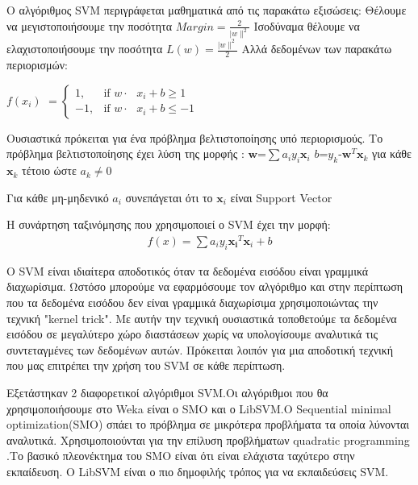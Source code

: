 Ο αλγόριθμος SVM περιγράφεται μαθηματικά από τις παρακάτω εξισώσεις:
\newline
Θέλουμε να μεγιστοποιήσουμε την ποσότητα   $ Margin=\frac{2}{|w\|^2} $
\newline
Ισοδύναμα θέλουμε να ελαχιστοποιήσουμε την ποσότητα  $ L(w)=\frac{|w\|^2}{2} $
\newline
	Αλλά δεδομένων των παρακάτω περιορισμών:


 $f(x_i)$ 
$ = \begin{cases} 1, & \mbox{if } w\cdot\mbox{ $x_i +b \geq 1 $} \\ -1, & \mbox{if } w\cdot\mbox{ $x_i +b \leq -1 $} \end{cases} $


 Ουσιαστικά πρόκειται για ένα πρόβλημα βελτιστοποίησης υπό περιορισμούς.
 Το πρόβλημα βελτιστοποίησης έχει λύση της μορφής :
\newline $\boldsymbol  w $=$\sum a_i y_i \boldsymbol x_i $ $b$=$y_k$-$\boldsymbol w^T \boldsymbol x_k$ για κάθε $\boldsymbol x_k$ τέτοιο ώστε $a_k\not= 0$
 
 Για κάθε μη-μηδενικό $a_i$ συνεπάγεται ότι το $\boldsymbol x_i$ είναι Support Vector
 
 Η συνάρτηση ταξινόμησης που χρησιμοποιεί ο SVM έχει την μορφή:
\begin{align*} 
f(x)=\sum a_i y_i \boldsymbol {x_i}^T \boldsymbol x_i +b
\end{align*}

Ο SVM είναι ιδιαίτερα αποδοτικός όταν τα δεδομένα εισόδου είναι γραμμικά διαχωρίσιμα. Ωστόσο μπορούμε να
 εφαρμόσουμε τον αλγόριθμο και στην περίπτωση που τα δεδομένα εισόδου δεν είναι γραμμικά διαχωρίσιμα
 χρησιμοποιώντας την τεχνική "kernel trick". Με αυτήν την τεχνική ουσιαστικά τοποθετούμε τα δεδομένα εισόδου σε μεγαλύτερο χώρο διαστάσεων χωρίς να υπολογίσουμε αναλυτικά τις συντεταγμένες των δεδομένων αυτών. Πρόκειται λοιπόν για μια αποδοτική τεχνική που μας επιτρέπει την χρήση του SVM σε κάθε περίπτωση.

Εξετάστηκαν 2 διαφορετικοί αλγόριθμοι SVM.Οι αλγόριθμοι που θα χρησιμοποιήσουμε στο Weka είναι ο SMO και ο LibSVM.O Sequential minimal optimization(SMO) σπάει το πρόβλημα σε μικρότερα προβλήματα τα οποία λύνονται αναλυτικά. Χρησιμοποιούνται για την επίλυση προβλήματων quadratic programming .Το βασικό πλεονέκτημα του SMO είναι ότι είναι ελάχιστα ταχύτερο στην εκπαίδευση. O LibSVM είναι ο πιο δημοφιλής τρόπος για να εκπαιδεύσεις SVM.



 
